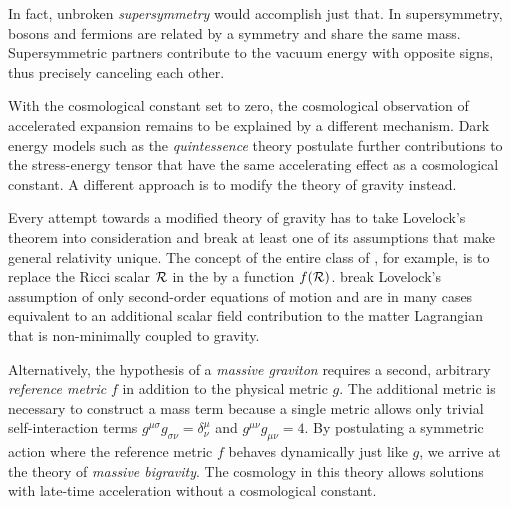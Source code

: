 \documentclass[12pt,parskip=half]{scrreprt}
\newcommand{\addref}{\todo[color=black!20]{ref.}}
\begin{document}
In fact, unbroken \emph{supersymmetry} would accomplish just that. In supersymmetry, bosons and fermions are related by a symmetry and share the same mass. Supersymmetric partners contribute to the vacuum energy with opposite signs, thus precisely canceling each other.

With the cosmological constant set to zero, the cosmological observation of accelerated expansion  remains to be explained by a different mechanism. Dark energy models such as the \emph{quintessence} theory \addref postulate further contributions to the stress-energy tensor that have the same accelerating effect as a cosmological constant. A different approach is to modify the theory of gravity instead.

Every attempt towards a modified theory of gravity has to take Lovelock's theorem into consideration and break at least one of its assumptions that make general relativity unique. The concept of the entire class of \emph{}, for example, is to replace the Ricci scalar \(\mathcal{R}\) in the  by a function \(f(\mathcal{R})\).
 break Lovelock's assumption of only second-order equations of motion and are in many cases equivalent to an additional scalar field contribution to the matter Lagrangian that is non-minimally coupled to gravity. \addref

Alternatively, the hypothesis of a \emph{massive graviton} requires a second, arbitrary \emph{reference metric} \(f\) in addition to the physical metric \(g\). The additional metric is necessary to construct a mass term because a single metric allows only trivial self-interaction terms \(g^{\mu\sigma}g_{\sigma\nu}=\delta^\mu_\nu\) and \(g^{\mu\nu}g_{\mu\nu} = 4\). By postulating a symmetric action where the reference metric \(f\) behaves dynamically just like \(g\), we arrive at the theory of \emph{massive bigravity}.
The cosmology in this theory allows solutions with late-time acceleration without a cosmological constant. \addref
\end{document}
